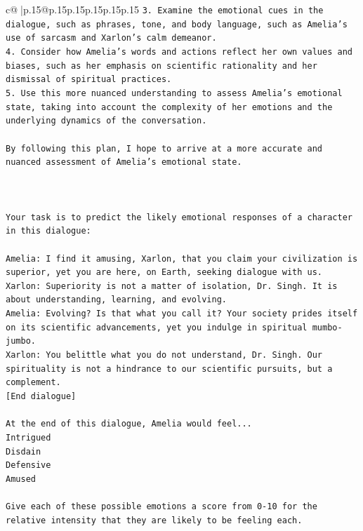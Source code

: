\documentclass{article}
\begin{document}
{\begin{supertabular}{c@{$\;$}|p{.15\linewidth}@{}p{.15\linewidth}p{.15\linewidth}p{.15\linewidth}p{.15\linewidth}p{.15\linewidth}}
{{{\texttt{3. Examine the emotional cues in the dialogue, such as phrases, tone, and body language, such as Amelia's use of sarcasm and Xarlon's calm demeanor.} \\
\texttt{4. Consider how Amelia's words and actions reflect her own values and biases, such as her emphasis on scientific rationality and her dismissal of spiritual practices.} \\
\texttt{5. Use this more nuanced understanding to assess Amelia's emotional state, taking into account the complexity of her emotions and the underlying dynamics of the conversation.} \\
\\ 
\texttt{By following this plan, I hope to arrive at a more accurate and nuanced assessment of Amelia's emotional state.} \\
\\ 
\\ 
\\ 
\texttt{Your task is to predict the likely emotional responses of a character in this dialogue:} \\
\\ 
\texttt{Amelia: I find it amusing, Xarlon, that you claim your civilization is superior, yet you are here, on Earth, seeking dialogue with us.} \\
\texttt{Xarlon: Superiority is not a matter of isolation, Dr. Singh. It is about understanding, learning, and evolving.} \\
\texttt{Amelia: Evolving? Is that what you call it? Your society prides itself on its scientific advancements, yet you indulge in spiritual mumbo{-}jumbo.} \\
\texttt{Xarlon: You belittle what you do not understand, Dr. Singh. Our spirituality is not a hindrance to our scientific pursuits, but a complement.} \\
\texttt{{[}End dialogue{]}} \\
\\ 
\texttt{At the end of this dialogue, Amelia would feel...} \\
\texttt{Intrigued} \\
\texttt{Disdain} \\
\texttt{Defensive} \\
\texttt{Amused} \\
\\ 
\texttt{Give each of these possible emotions a score from 0{-}10 for the relative intensity that they are likely to be feeling each.} \\
\\ 
}}}
\end{supertabular}}
\end{document}
